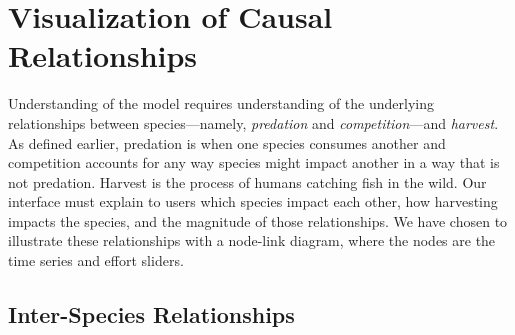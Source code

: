 \section{Visualization of Causal Relationships}

Understanding of the model requires understanding of the underlying relationships between species---namely, \textit{predation} and \textit{competition}---and \textit{harvest}.  As defined earlier, predation is when one species consumes another and competition accounts for any way species might impact another in a way that is not predation.  Harvest is the process of humans catching fish in the wild.  Our interface must explain to users which species impact each other, how harvesting impacts the species, and the magnitude of those relationships.  We have chosen to illustrate these relationships with a node-link diagram, where the nodes are the time series and effort sliders.

\subsection{Inter-Species Relationships}
\label{sec:interSpeciesArc}


